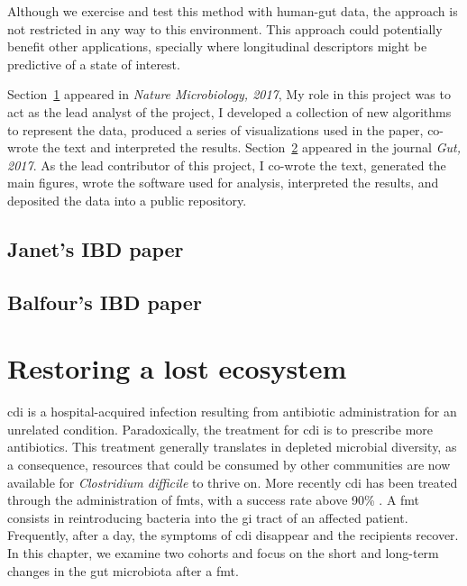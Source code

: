 \documentclass[12pt,chapterheads]{ucsd}
\begin{document}
Although we exercise and test this method with human-gut data, the approach is 
not restricted in any way to this environment. This approach could potentially 
benefit other applications, specially where longitudinal descriptors might be 
predictive of a state of interest.

Section~\ref{section_plane} appeared in \textsl{Nature Microbiology, 2017}, My 
role in this project was to act as the lead analyst of the project, I developed 
a collection of new algorithms to represent the data, produced a series of 
visualizations used in the paper, co-wrote the text and interpreted the 
results. Section~\ref{section_ibd} appeared in the journal \textsl{Gut, 2017}.  
As the lead contributor of this project, I co-wrote the text, generated the 
main figures, wrote the software used for analysis, interpreted the results, 
and deposited the data into a public repository.

\ifdefined\RELEASE
    
    
\else
    \section{Janet's IBD paper}\label{section_plane}
    \section{Balfour's IBD paper}\label{section_ibd}
\fi

\chapter{Restoring a lost ecosystem}\label{chapter_fmts}
\glsresetall

\gls{cdi} is a hospital-acquired infection resulting from antibiotic 
administration for an unrelated condition. Paradoxically, the treatment for 
\gls{cdi} is to prescribe more antibiotics. This treatment generally translates 
in depleted microbial diversity, as a consequence, resources that could be 
consumed by other communities are now available for \textit{Clostridium 
difficile} to thrive on.  More recently \gls{cdi} has been treated through the 
administration of \glspl{fmt}, with a success rate above 90\% \cite{RN4129}. A 
\gls{fmt} consists in reintroducing bacteria into the \gls{gi} tract of an 
affected patient. Frequently, after a day, the symptoms of \gls{cdi} disappear 
and the recipients recover. In this chapter, we examine two cohorts and focus 
on the short and long-term changes in the gut microbiota after a \gls{fmt}.
\end{document}
